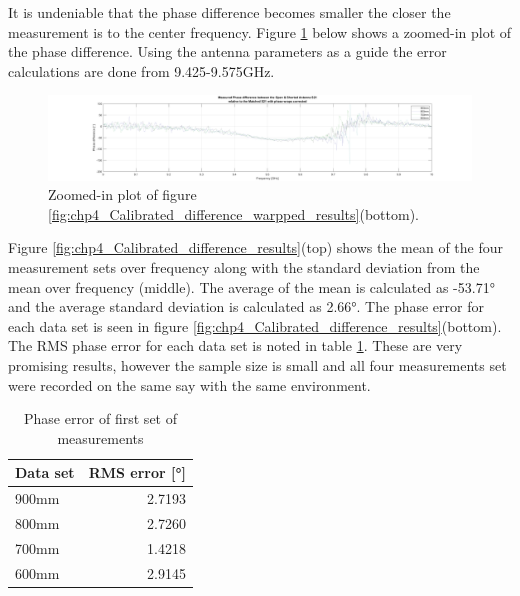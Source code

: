 It is undeniable that the phase difference becomes smaller the closer the measurement is to the center frequency. Figure \ref{fig:chp4_Calibrated_difference_zoom} below shows a zoomed-in plot of the phase difference. Using the antenna parameters as a guide the error calculations are done from 9.425-9.575GHz.

    \begin{figure}[H]
    \centering
    \includegraphics[width=0.99\linewidth]{Figures/chp4_Calibrated_difference_zoom.png}
    \caption{Zoomed-in plot of figure \ref{fig:chp4_Calibrated_difference_warpped_results}(bottom).}
    \label{fig:chp4_Calibrated_difference_zoom}
    \end{figure}

Figure \ref{fig:chp4_Calibrated_difference_results}(top) shows the mean of the four measurement sets over frequency along with the standard deviation from the mean over frequency (middle). The average of the mean is calculated as -53.71° and the average standard deviation is calculated as 2.66°. The phase error for each data set is seen in figure \ref{fig:chp4_Calibrated_difference_results}(bottom). The RMS phase error for each data set is noted in table \ref{tab:errorDay1}. These are very promising results, however the sample size is small and all four measurements set were recorded on the same say with the same environment. 

    \begin{table}[H]
    \centering
    \caption{Phase error of first set of measurements}
    \begin{tabular}{|l|r|} 
    \hline
    \textbf{Data set} & \textbf{RMS error [°]}   \\ 
    \hline
    900mm                 & 2.7193        \\ 
    \hline
    800mm                 & 2.7260     \\
    \hline
    700mm                 & 1.4218    \\
    \hline
    600mm                 & 2.9145     \\
    \hline
    \end{tabular}
    \label{tab:errorDay1}
    \end{table}

